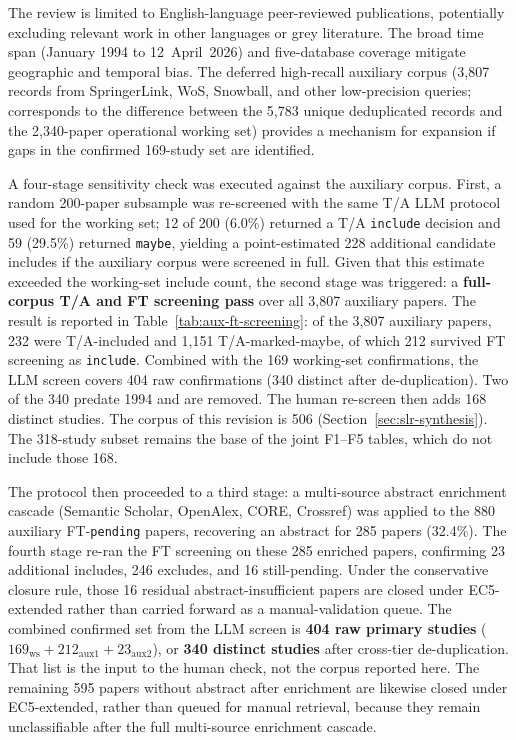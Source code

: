 The review is limited to English-language peer-reviewed publications,
potentially excluding relevant work in other languages or grey literature.
The broad time span (January 1994 to 12~April~2026) and five-database coverage mitigate
geographic and temporal bias. The deferred high-recall auxiliary corpus
(3{,}807 records from SpringerLink, WoS, Snowball, and other low-precision
queries; corresponds to the difference between the 5{,}783 unique deduplicated
records and the 2{,}340-paper operational working set) provides a mechanism
for expansion if gaps in the confirmed 169-study set are identified.

A four-stage sensitivity check was executed against the auxiliary corpus.
First, a random 200-paper subsample was re-screened with the same T/A LLM
protocol used for the working set;
12 of 200 (6.0\%) returned a T/A
\texttt{include} decision and 59 (29.5\%) returned \texttt{maybe}, yielding
a point-estimated 228 additional candidate includes if the auxiliary corpus
were screened in full. Given that this estimate exceeded the working-set
include count, the second stage was triggered: a \textbf{full-corpus
T/A and FT screening pass} over all 3{,}807 auxiliary papers.
The result is reported in
Table~\ref{tab:aux-ft-screening}: of the 3{,}807 auxiliary papers, 232
were T/A-included and 1{,}151 T/A-marked-maybe, of which 212 survived FT
screening as \texttt{include}. Combined with the 169 working-set
confirmations, the LLM screen covers 404 raw confirmations (340 distinct
after de-duplication). Two of the 340 predate 1994 and are removed. The
human re-screen then adds 168 distinct studies. The corpus of this revision
is 506 (Section~\ref{sec:slr-synthesis}). The 318-study subset remains the
base of the joint F1--F5 tables, which do not include those 168.

The protocol then proceeded to a third stage: a multi-source abstract
enrichment cascade (Semantic Scholar, OpenAlex, CORE, Crossref) was applied
to the 880 auxiliary FT-\texttt{pending} papers,
recovering an abstract for 285 papers
(32.4\%). The fourth stage re-ran the FT screening on these 285 enriched
papers, confirming 23 additional includes,
246 excludes, and 16 still-pending. Under the conservative closure rule,
those 16 residual abstract-insufficient papers are closed under EC5-extended
rather than carried forward as a manual-validation queue. The combined
confirmed set from the LLM screen is \textbf{404 raw primary studies}
($169_{\text{ws}} + 212_{\text{aux1}} + 23_{\text{aux2}}$), or
\textbf{340 distinct studies} after cross-tier de-duplication. That list is
the input to the human check, not the corpus reported here.
The remaining 595 papers without abstract after enrichment are likewise closed under
EC5-extended, rather than queued for manual retrieval, because they remain
unclassifiable after the full multi-source enrichment cascade.

